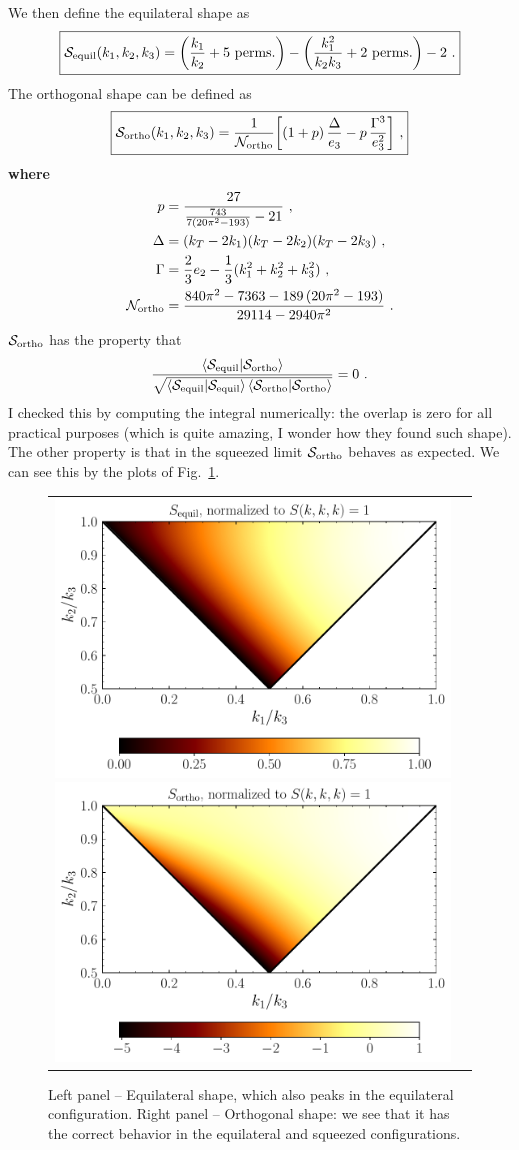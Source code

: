 \documentclass[aps,prd,amsmath,floats,floatfix,superscriptaddress,nofootinbib%
]{revtex4}%
\renewcommand\({\left(}
\renewcommand\){\right)}
\renewcommand\[{\left[}
\renewcommand\]{\right]}
\begin{document}
We then define the equilateral shape as 
\begin{equation}
\boxed{{\cal S}_{\rm equil}(k_1,k_2,k_3) = \bigg(\frac{k_1}{k_2} + \text{$5$ perms.}\bigg) - \bigg(\frac{k_1^2}{k_2k_3} + \text{$2$ perms.}\bigg) - 2\,\,.} 
\end{equation}
The orthogonal shape can be defined as 
\begin{equation}
\boxed{{\cal S}_{\rm ortho}(k_1,k_2,k_3) = \frac{1}{{\cal N}_{\rm ortho}}\bigg[(1+p)\,\frac{\Delta}{e_3} - p\,\frac{\Gamma^3}{e_3^2}\bigg]\,\,,} 
\end{equation} 
\textbf{where} 
\begin{align*}
p &= \frac{27}{\frac{743}{7(20\pi^2-193)} - 21}\,\,,%
\\
\Delta &= (k_T-2k_1)(k_T-2k_2)(k_T-2k_3)\,\,,%
\\
\Gamma &= \frac{2}{3}e_2 - \frac{1}{3}(k_1^2+k_2^2+k_3^2)\,\,,%
\\
{\cal N}_{\rm ortho} &= \frac{840\pi^2 - 7363 - 189\,(20\pi^2-193)}{29114 - 2940\pi^2}\,\,.%
\end{align*}
${\cal S}_{\rm ortho}$ has the property that 
\begin{equation}
\frac{\braket{{\cal S}_{\rm equil}|{\cal S}_{\rm ortho}}}{\sqrt{\braket{{\cal S}_{\rm equil}|{\cal S}_{\rm equil}}\braket{{\cal S}_{\rm ortho}|{\cal S}_{\rm ortho}}}} = 0\,\,. 
\end{equation}
I checked this by computing the integral numerically: the overlap is zero for all practical purposes (which is quite amazing, I wonder how they found such shape). 
The other property is that in the squeezed limit ${\cal S}_{\rm ortho}$ behaves as expected. We can see this by the plots of Fig.~\ref{fig:equil_ortho}. 
\begin{figure}[h!]
\centering
\begin{tabular}{cc}
\includegraphics[width=0.475\columnwidth]{plot_equilateral.pdf} 
\includegraphics[width=0.475\columnwidth]{plot_orthogonal.pdf}
\end{tabular}
\caption{{Left panel} -- Equilateral shape, which also peaks in the equilateral configuration. 
{Right panel} -- Orthogonal shape: we see that it has the correct behavior in the equilateral and squeezed configurations.} 
\label{fig:equil_ortho}
\end{figure} 
\end{document}
